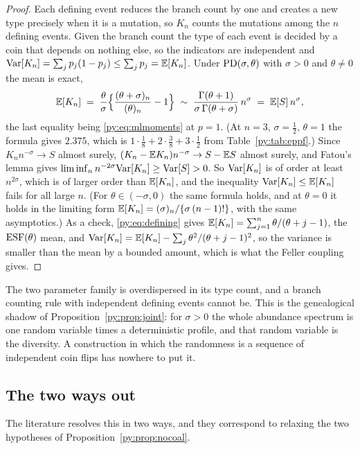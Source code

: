 \begin{proof}
Each defining event reduces the branch count by one and creates a new type precisely when it is a
mutation, so $K_n$ counts the mutations among the $n$ defining events. Given the branch count the
type of each event is decided by a coin that depends on nothing else, so the indicators are
independent and $\mathrm{Var}[K_n] = \sum_j p_j(1-p_j) \le \sum_j p_j = \mathbb{E}[K_n]$. Under $\mathrm{PD}(\sigma,\theta)$
with $\sigma > 0$ and $\theta \ne 0$ the mean is exact,
\[
\mathbb{E}[K_n] \;=\; \frac{\theta}{\sigma}\Big\{\frac{(\theta+\sigma)_n}{(\theta)_n} - 1\Big\}
\;\sim\; \frac{\Gamma(\theta+1)}{\sigma\,\Gamma(\theta+\sigma)}\,n^{\sigma} \;=\; \mathbb{E}[S]\,n^{\sigma},
\]
the last equality being \eqref{py:eq:mlmoments} at $p = 1$. (At $n = 3$, $\sigma = \tfrac12$,
$\theta = 1$ the formula gives $2.375$, which is $1\cdot\tfrac18 + 2\cdot\tfrac38 + 3\cdot\tfrac12$
from Table~\ref{py:tab:eppf}.) Since $K_n n^{-\sigma} \to S$ almost surely,
$(K_n-\mathbb{E} K_n)n^{-\sigma} \to S-\mathbb{E} S$ almost surely, and Fatou's lemma gives
$\liminf_n n^{-2\sigma}\mathrm{Var}[K_n] \ge \mathrm{Var}[S] > 0$. So $\mathrm{Var}[K_n]$ is of order at least
$n^{2\sigma}$, which is of larger order than $\mathbb{E}[K_n]$, and the inequality
$\mathrm{Var}[K_n] \le \mathbb{E}[K_n]$ fails for all large $n$. (For $\theta \in (-\sigma,0)$ the same formula holds, and at $\theta = 0$ it holds in the limiting
form $\mathbb{E}[K_n] = (\sigma)_n/\{\sigma\,(n-1)!\}$, with the same asymptotics.)
As a check, \eqref{py:eq:defining} gives $\mathbb{E}[K_n] = \sum_{j=1}^{n}\theta/(\theta+j-1)$, the
$\mathrm{ESF}(\theta)$ mean, and $\mathrm{Var}[K_n] = \mathbb{E}[K_n] - \sum_j \theta^{2}/(\theta+j-1)^{2}$, so the
variance is smaller than the mean by a bounded amount, which is what the Feller coupling gives.
\end{proof}

The two parameter family is overdispersed in its type count, and a branch counting rule with
independent defining events cannot be. This is the genealogical shadow of
Proposition~\ref{py:prop:joint}: for $\sigma > 0$ the whole abundance spectrum is one random variable
times a deterministic profile, and that random variable is the diversity. A construction in which
the randomness is a sequence of independent coin flips has nowhere to put it.

\subsection{The two ways out}

The literature resolves this in two ways, and they correspond to relaxing the two hypotheses of
Proposition~\ref{py:prop:nocoal}.

